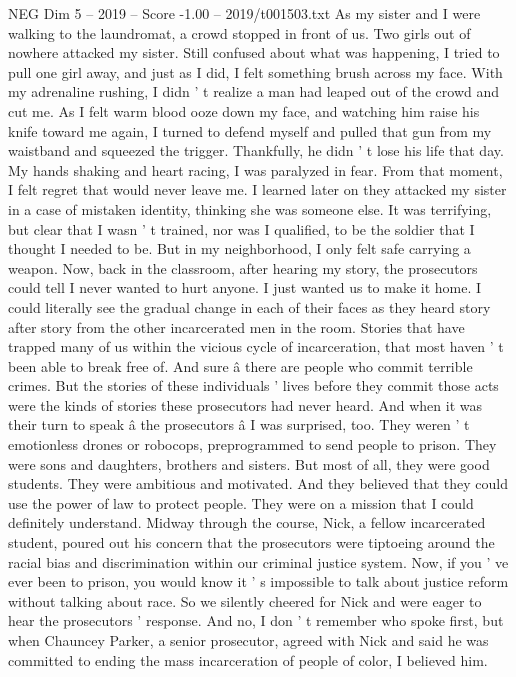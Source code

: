 \begin{textsample}{NEG Dim 5 – 2019 – Score -1.00 – 2019/t001503.txt}
As my sister and I were walking to the laundromat, a crowd stopped in front of us.
Two girls out of nowhere attacked my sister.
Still confused about what was happening, I tried to pull one girl away, and just as I did, I felt something brush across my face.
With my adrenaline rushing, I didn ' t realize a man had leaped out of the crowd and cut me.
As I felt warm blood ooze down my face, and watching him raise his knife toward me again, I turned to defend myself and pulled that gun from my waistband and squeezed the trigger.
Thankfully, he didn ' t lose his life that day.
My hands shaking and heart racing, I was paralyzed in fear.
From that moment, I felt regret that would never leave me.
I learned later on they attacked my sister in a case of mistaken identity, thinking she was someone else.
It was terrifying, but clear that I wasn ' t trained, nor was I qualified, to be the soldier that I thought I needed to be.
But in my neighborhood, I only felt safe carrying a weapon.
Now, back in the classroom, after hearing my story, the prosecutors could tell I never wanted to hurt anyone.
I just wanted us to make it home.
I could literally see the gradual change in each of their faces as they heard story after story from the other incarcerated men in the room.
Stories that have trapped many of us within the vicious cycle of incarceration, that most haven ' t been able to break free of.
And sure â there are people who commit terrible crimes.
But the stories of these individuals ' lives before they commit those acts were the kinds of stories these prosecutors had never heard.
And when it was their turn to speak â the prosecutors â I was surprised, too.
They weren ' t emotionless drones or robocops, preprogrammed to send people to prison.
They were sons and daughters, brothers and sisters.
But most of all, they were good students.
They were ambitious and motivated.
And they believed that they could use the power of law to protect people.
They were on a mission that I could definitely understand.
Midway through the course, Nick, a fellow incarcerated student, poured out his concern that the prosecutors were tiptoeing around the racial bias and discrimination within our criminal justice system.
Now, if you ' ve ever been to prison, you would know it ' s impossible to talk about justice reform without talking about race.
So we silently cheered for Nick and were eager to hear the prosecutors ' response.
And no, I don ' t remember who spoke first, but when Chauncey Parker, a senior prosecutor, agreed with Nick and said he was committed to ending the mass incarceration of people of color, I believed him.

\end{textsample}
